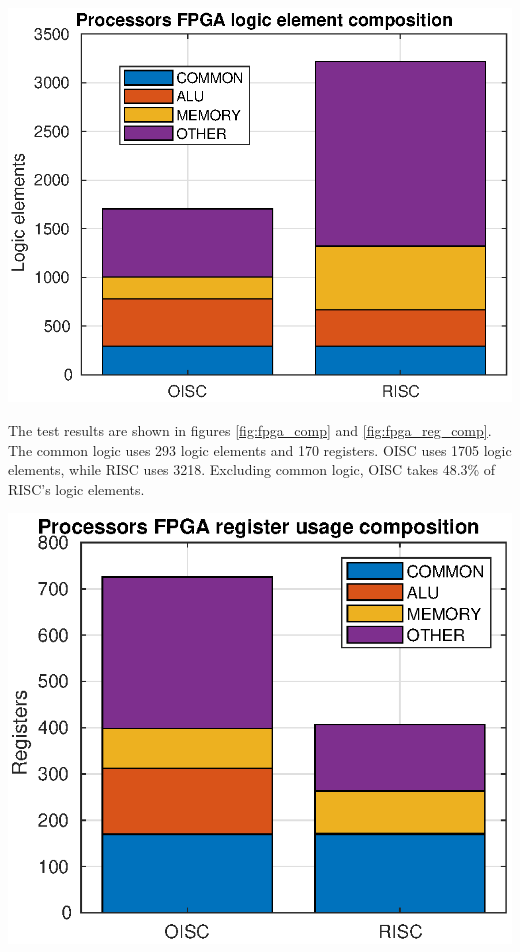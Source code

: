 \begin{colfigure}
	\centering
	\includegraphics[width=\linewidth]{../tests/fpga_comp.eps}
	\label{fig:fpga_comp}
\end{colfigure}

The test results are shown in figures \ref{fig:fpga_comp} and \ref{fig:fpga_reg_comp}. The common logic uses 293 logic elements and 170 registers. OISC uses 1705 logic elements, while RISC uses 3218. Excluding common logic, OISC takes 48.3\% of RISC's logic elements.


\begin{colfigure}
	\centering
	\includegraphics[width=\linewidth]{../tests/fpga_reg_comp.eps}
	\label{fig:fpga_reg_comp}
\end{colfigure}

